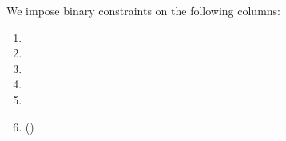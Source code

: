 We impose binary constraints on the following columns:
\begin{multicols}{3}
	\begin{enumerate}
		\item {}
		\item {}
		\item \genBit{}
		\item \tinyNonzeroNonce{}
		\item \lc{}
		\item \selectorKeccakRes{} (\quad \trash)
	\end{enumerate}
\end{multicols}

